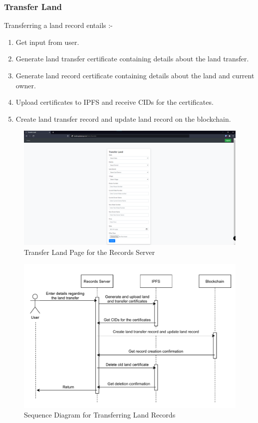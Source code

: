 \documentclass{article}
\begin{document}
        \subsubsection{Transfer Land}
            Transferring a land record entails :-
            \begin{enumerate}
                \item Get input from user.
                \item Generate land transfer certificate containing details about the land transfer.
                \item Generate land record certificate containing details about the land and current owner.
                \item Upload certificates to IPFS and receive CIDs for the certificates.
                \item Create land transfer record and update land record on the blockchain.
            \end{enumerate}
            \begin{figure}[htbp]
                \includegraphics[scale=0.25]{records_transfer}
                \centering
                \caption{Transfer Land Page for the Records Server}
            \end{figure}

            \begin{figure}[htbp]
                \includegraphics[scale=0.25]{records_seq_transfer}
                \centering
                \caption{Sequence Diagram for Transferring Land Records}
            \end{figure}
\end{document}
